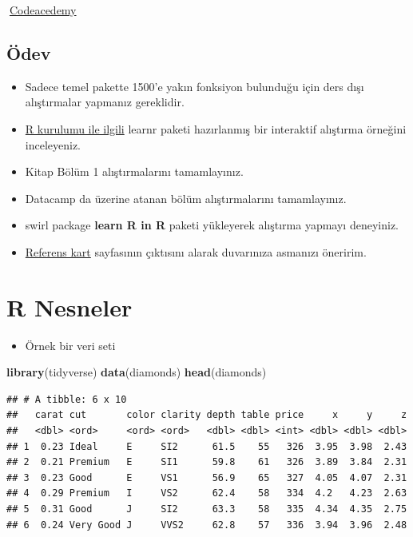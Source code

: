 \documentclass[
  oneside]{book}
\newenvironment{Shaded}{\begin{snugshade}}{\end{snugshade}}
\newcommand{\FunctionTok}[1]{\textcolor[rgb]{0.13,0.29,0.53}{\textbf{#1}}}
\newcommand{\NormalTok}[1]{#1}
\providecommand{\tightlist}{%
  \setlength{\itemsep}{0pt}\setlength{\parskip}{0pt}}
\begin{document}
\begin{try}
🔗\href{https://www.codecademy.com/learn}{Codeacedemy}

\end{try}

\hypertarget{uxf6dev-1}{%
\section{Ödev}\label{uxf6dev-1}}

\begin{itemize}
\item
  Sadece temel pakette 1500'e yakın fonksiyon bulunduğu için ders dışı alıştırmalar yapmanız gereklidir.
\item
  \href{https://learnr-examples.shinyapps.io/ex-setup-r/}{R kurulumu ile ilgili} learnr paketi hazırlanmış bir interaktif alıştırma örneğini inceleyeniz.
\item
  Kitap Bölüm 1 alıştırmalarını tamamlayınız.
\item
  Datacamp da üzerine atanan bölüm alıştırmalarını tamamlayınız.
\item
  swirl package \textbf{learn R in R} paketi yükleyerek alıştırma yapmayı deneyiniz.
\item
  \href{https://cran.r-project.org/doc/contrib/Short-refcard.pdf}{Referens kart} sayfasının çıktısını alarak duvarınıza asmanızı öneririm.
\end{itemize}

\hypertarget{r-nesneler}{%
\chapter{R Nesneler}\label{r-nesneler}}

\begin{itemize}
\tightlist
\item
  Örnek bir veri seti
\end{itemize}

\begin{Shaded}
\begin{Highlighting}[]
\FunctionTok{library}\NormalTok{(tidyverse)}
\FunctionTok{data}\NormalTok{(diamonds)}
\FunctionTok{head}\NormalTok{(diamonds)}
\end{Highlighting}
\end{Shaded}

\begin{verbatim}
## # A tibble: 6 x 10
##   carat cut       color clarity depth table price     x     y     z
##   <dbl> <ord>     <ord> <ord>   <dbl> <dbl> <int> <dbl> <dbl> <dbl>
## 1  0.23 Ideal     E     SI2      61.5    55   326  3.95  3.98  2.43
## 2  0.21 Premium   E     SI1      59.8    61   326  3.89  3.84  2.31
## 3  0.23 Good      E     VS1      56.9    65   327  4.05  4.07  2.31
## 4  0.29 Premium   I     VS2      62.4    58   334  4.2   4.23  2.63
## 5  0.31 Good      J     SI2      63.3    58   335  4.34  4.35  2.75
## 6  0.24 Very Good J     VVS2     62.8    57   336  3.94  3.96  2.48
\end{verbatim}
\end{document}
